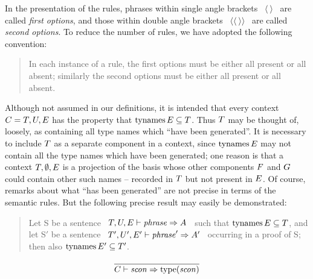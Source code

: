 In the presentation of the rules, phrases within single
angle brackets ~$\langle\ \rangle$~ are called {\sl
first options}, and those within double
angle brackets ~$\langle\langle\ \rangle\rangle$~ are called {\sl
second options}.  To reduce the number of rules, we have adopted the
following convention:
\begin{quote} In each instance of a rule, the
first options must be either all present or all absent;
similarly the second options must be either all present or all absent.
\end{quote}

Although not assumed in our definitions, it is intended that every
context $C=T,U,E$ has the property that $\mathop{\rm tynames}\nolimits E\subseteq T$.
Thus $T$ may be thought of, loosely, as containing all type names
which ``have been generated''. It is necessary to include $T$ as a
separate component in a context, since $\mathop{\rm tynames}\nolimits E$ may not contain
all the type names which have been generated; one reason is that a
context $T,\emptyset,E$ is a projection of the basis
\replacement{\thenostrsharing}{$\B=(\M,\T),\F,\G,\E$}{$\B=\T,\F,\G,\E$} 
whose other components $F$ and $G$
could contain other such names -- recorded in $T$ but not present in
$E$.  Of course, remarks about what ``has been generated'' are not
precise in terms of the semantic rules. But the following precise result
may easily be demonstrated:
\begin{quote}
Let S be a sentence
~$T,U,E\vdash{\it phrase}\Rightarrow A$~ such that
$\mathop{\rm tynames}\nolimits E\subseteq T$,
and let S$'$ be a sentence
~$T',U',E'\vdash{\it phrase}'\Rightarrow A'$~
occurring in a proof of S; then also
$\mathop{\rm tynames}\nolimits E'\subseteq T'$.
\end{quote}



%

\begin{equation}        %
\label{sconexp-rule}
\frac{}
     {\C\ts\scon\ra\scontype(\scon)}\index{26.3}
\end{equation}

\replacement{\theidstatus}{\begin{equation}        %
\label{varexp-rule}
\frac{\C(\longvar)\succ\tau}
     {\C\ts\longvar\ra\tau}
\end{equation}}{\begin{equation}        %
\label{varexp-rule}
\frac{\C(\longvid) = (\sigma,\is)\qquad\sigma\succ\tau}
     {\C\ts\longvid\ra\tau}
\end{equation}}

